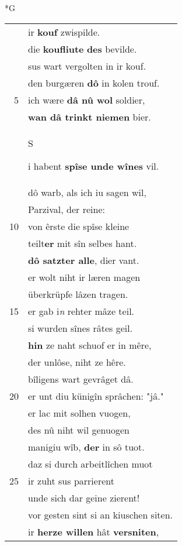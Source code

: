 \documentclass[8pt,a4paper,notitlepage]{article}
\begin{document}
\begin{table}[ht]
\begin{minipage}[t]{0.5\linewidth}
\small
\begin{center}*G
\end{center}
\begin{tabular}{rl}
 & ir \textbf{kouf} zwispilde.\\ 
 & die \textbf{koufliute} \textbf{des} bevilde.\\ 
 & sus wart vergolten in ir kouf.\\ 
 & den burgæren \textbf{dô} in kolen trouf.\\ 
5 & ich wære \textbf{dâ nû wol} soldier,\\ 
 & \textbf{wan dâ trinkt niemen} bier.\\ 
 & \begin{large}S\end{large}i habent \textbf{spîse unde wînes} vil.\\ 
 & dô warb, als ich iu sagen wil,\\ 
 & Parzival, der reine:\\ 
10 & von êrste die spîse kleine\\ 
 & teilt\textbf{er} mit sîn selbes hant.\\ 
 & \textbf{dô satzter alle}, dier vant.\\ 
 & er wolt niht ir læren magen\\ 
 & überkrüpfe lâzen tragen.\\ 
15 & er gab i\textit{n} rehter mâze teil.\\ 
 & si wurden sînes râtes geil.\\ 
 & \textbf{hin} ze naht schuof er in mêre,\\ 
 & der unlôse, niht ze hêre.\\ 
 & bîligens wart gevrâget dâ.\\ 
20 & er unt diu künigîn sprâchen: "jâ."\\ 
 & er lac mit solhen vuogen,\\ 
 & des nû niht wil genuogen\\ 
 & manigiu wîb, \textbf{der} in sô tuot.\\ 
 & daz si durch arbeitlîchen muot\\ 
25 & ir zuht sus parrierent\\ 
 & unde sich dar geine zierent!\\ 
 & vor gesten sint si an kiuschen siten.\\ 
 & ir \textbf{herze willen} hât \textbf{versniten},\\ 

\end{tabular}
\end{minipage}
\end{table}
\end{document}
